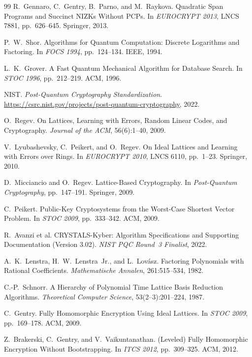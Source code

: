 ﻿\documentclass[a4paper,12pt]{scrreprt}
\theoremstyle{definition}
\begin{document}
\begin{thebibliography}{99}
R.\ Gennaro, C.\ Gentry, B.\ Parno, and M.\ Raykova. Quadratic Span Programs and Succinct NIZKs Without PCPs. In \textit{EUROCRYPT 2013}, LNCS 7881, pp.\ 626--645. Springer, 2013.

P.\ W.\ Shor. Algorithms for Quantum Computation: Discrete Logarithms and Factoring. In \textit{FOCS 1994}, pp.\ 124--134. IEEE, 1994.

L.\ K.\ Grover. A Fast Quantum Mechanical Algorithm for Database Search. In \textit{STOC 1996}, pp.\ 212--219. ACM, 1996.

NIST. \textit{Post-Quantum Cryptography Standardization}. \url{https://csrc.nist.gov/projects/post-quantum-cryptography}, 2022.

O.\ Regev. On Lattices, Learning with Errors, Random Linear Codes, and Cryptography. \textit{Journal of the ACM}, 56(6):1--40, 2009.

V.\ Lyubashevsky, C.\ Peikert, and O.\ Regev. On Ideal Lattices and Learning with Errors over Rings. In \textit{EUROCRYPT 2010}, LNCS 6110, pp.\ 1--23. Springer, 2010.

D.\ Micciancio and O.\ Regev. Lattice-Based Cryptography. In \textit{Post-Quantum Cryptography}, pp.\ 147--191. Springer, 2009.

C.\ Peikert. Public-Key Cryptosystems from the Worst-Case Shortest Vector Problem. In \textit{STOC 2009}, pp.\ 333--342. ACM, 2009.

R.\ Avanzi et al. CRYSTALS-Kyber: Algorithm Specifications and Supporting Documentation (Version 3.02). \textit{NIST PQC Round~3 Finalist}, 2022.

A.\ K.\ Lenstra, H.\ W.\ Lenstra~Jr., and L.\ Lov\'asz. Factoring Polynomials with Rational Coefficients. \textit{Mathematische Annalen}, 261:515--534, 1982.

C.-P.\ Schnorr. A Hierarchy of Polynomial Time Lattice Basis Reduction Algorithms. \textit{Theoretical Computer Science}, 53(2--3):201--224, 1987.

C.\ Gentry. Fully Homomorphic Encryption Using Ideal Lattices. In \textit{STOC 2009}, pp.\ 169--178. ACM, 2009.

Z.\ Brakerski, C.\ Gentry, and V.\ Vaikuntanathan. (Leveled) Fully Homomorphic Encryption Without Bootstrapping. In \textit{ITCS 2012}, pp.\ 309--325. ACM, 2012.


\end{thebibliography}
\end{document}
